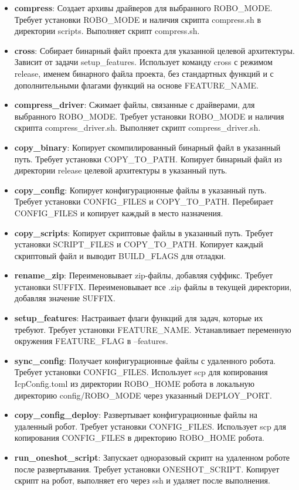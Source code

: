 \begin{itemize}
    \item \textbf{compress}: Создает архивы драйверов для выбранного ROBO\_MODE. Требует установки ROBO\_MODE и наличия скрипта compress.sh в директории scripts. Выполняет скрипт compress.sh.
    \item \textbf{cross}: Собирает бинарный файл проекта для указанной целевой архитектуры. Зависит от задачи setup\_features. Использует команду cross с режимом release, именем бинарного файла проекта, без стандартных функций и с дополнительными флагами функций на основе FEATURE\_NAME.
    \item \textbf{compress\_driver}: Сжимает файлы, связанные с драйверами, для выбранного ROBO\_MODE. Требует установки ROBO\_MODE и наличия скрипта compress\_driver.sh. Выполняет скрипт compress\_driver.sh.
    \item \textbf{copy\_binary}: Копирует скомпилированный бинарный файл в указанный путь. Требует установки COPY\_TO\_PATH. Копирует бинарный файл из директории release целевой архитектуры в указанный путь.
    \item \textbf{copy\_config}: Копирует конфигурационные файлы в указанный путь. Требует установки CONFIG\_FILES и COPY\_TO\_PATH. Перебирает CONFIG\_FILES и копирует каждый в место назначения.
    \item \textbf{copy\_scripts}: Копирует скриптовые файлы в указанный путь. Требует установки SCRIPT\_FILES и COPY\_TO\_PATH. Копирует каждый скриптовый файл и выводит BUILD\_FLAGS для отладки.
    \item \textbf{rename\_zip}: Переименовывает zip-файлы, добавляя суффикс. Требует установки SUFFIX. Переименовывает все .zip файлы в текущей директории, добавляя значение SUFFIX.
    \item \textbf{setup\_features}: Настраивает флаги функций для задач, которые их требуют. Требует установки FEATURE\_NAME. Устанавливает переменную окружения FEATURE\_FLAG в --features.
    \item \textbf{sync\_config}: Получает конфигурационные файлы с удаленного робота. Требует установки CONFIG\_FILES. Использует scp для копирования IcpConfig.toml из директории ROBO\_HOME робота в локальную директорию config/ROBO\_MODE через указанный DEPLOY\_PORT.
    \item \textbf{copy\_config\_deploy}: Развертывает конфигурационные файлы на удаленный робот. Требует установки CONFIG\_FILES. Использует scp для копирования CONFIG\_FILES в директорию ROBO\_HOME робота.
    \item \textbf{run\_oneshot\_script}: Запускает одноразовый скрипт на удаленном роботе после развертывания. Требует установки ONESHOT\_SCRIPT. Копирует скрипт на робот, выполняет его через ssh и удаляет после выполнения.

\end{itemize}
